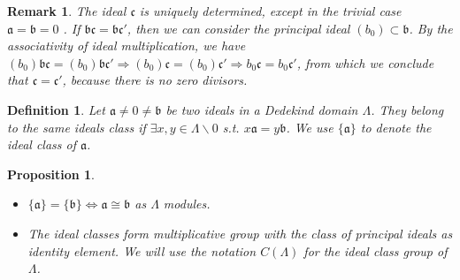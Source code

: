 \documentclass[11pt]{article}
\newtheorem{prop}[thm]{Proposition}
\newtheorem{dfn}[thm]{Definition}
\newtheorem{rmk}[thm]{Remark}
\newcommand{\sca}{{\mathfrak a}}
\newcommand{\scb}{{\mathfrak b}}
\newcommand{\scc}{{\mathfrak c}}
\newcommand{\Lrta}{\Longrightarrow}
\begin{document}
\begin{rmk}\label{rmk:unique_ideal}
The ideal $\scc$ is uniquely determined, except in the trivial case $\sca=\scb=0$ . If $\scb\scc=\scb\scc'$, then we can consider the principal ideal $(b_0)\subset \scb$. By the associativity of ideal multiplication, we have $(b_0)\scb\scc=(b_0)\scb\scc'\Lrta (b_0)\scc=(b_0)\scc'\Lrta b_0\scc=b_0\scc'$, from which we conclude that $\scc=\scc'$, because there is no zero divisors.
\end{rmk}
\begin{dfn}
Let $\sca\neq0\neq \scb$ be two ideals in a Dedekind domain $\Lambda$. They belong to the same ideals class if $\exists x, y \in \Lambda\backslash {0}$ s.t. $x\sca=y\scb$. We use $\{\sca\}$ to denote the ideal class of $\sca$.
\end{dfn}

\begin{prop}\label{prop:iso_ideal_class} \ 
\begin{itemize}
\item $\{\sca\}=\{\scb\}\Longleftrightarrow \sca\cong\scb$ as $\Lambda$ modules.
\item The ideal classes form multiplicative group with the class of principal ideals as identity element. We will use the notation $C(\Lambda)$ for the ideal class group of $\Lambda$.
\end{itemize}
\end{prop}
\end{document}
